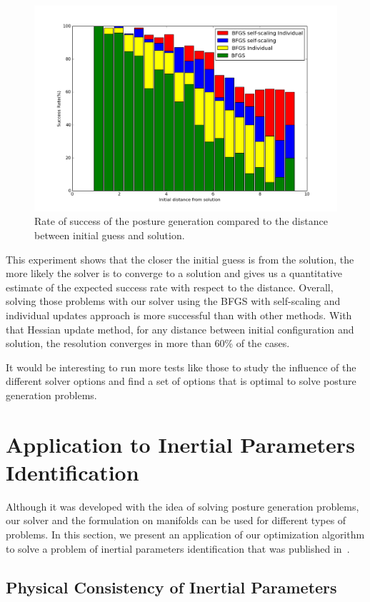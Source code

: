\begin{figure}[htb]
\centering
  \includegraphics[width=0.8\linewidth]{histogram4BFGS.png}
  \caption{Rate of success of the posture generation compared to the distance between initial guess and solution.}
\label{hist:dist}
\end{figure}

This experiment shows that the closer the initial guess is from the solution, the more likely the solver is to converge to a solution and gives us a quantitative estimate of the expected success rate with respect to the distance.
Overall, solving those problems with our solver using the BFGS with self-scaling and individual updates approach is more successful than with other methods.
With that Hessian update method, for any distance between initial configuration and solution, the resolution converges in more than 60\% of the cases.

It would be interesting to run more tests like those to study the influence of the different solver options and find a set of options that is optimal to solve posture generation problems.

\FloatBarrier
\section{Application to Inertial Parameters Identification}
\label{sec:inertial_parameters}

Although it was developed with the idea of solving posture generation problems, our solver and the formulation on manifolds can be used for different types of problems.
In this section, we present an application of our optimization algorithm to solve a problem of inertial parameters identification that was published in~\cite{traversaro:iros:2016}.

\subsection{Physical Consistency of Inertial Parameters}
\label{sub:physical_consistency_of_inertial_parameters}


